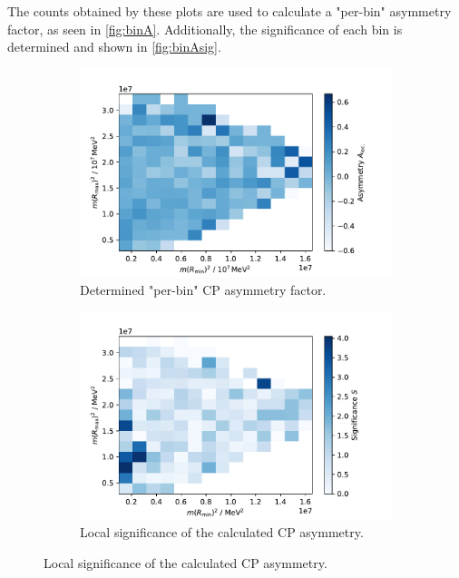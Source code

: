 The counts obtained by these plots are used to calculate a "per-bin" asymmetry factor, 
as seen in \autoref{fig:binA}. Additionally, the significance of each bin is 
determined and shown in \autoref{fig:binAsig}.

\begin{figure}[H]
	\centering
	\begin{subfigure}{0.45\textwidth}
		\includegraphics[width=\textwidth]{content/pictures/image_fin/DalitzDataBPhistACPV.pdf}
		\caption{Determined "per-bin"  CP asymmetry factor.}
		\label{fig:binA}
	\end{subfigure}
	\begin{subfigure}{0.45\textwidth}
		\includegraphics[width=\textwidth]{content/pictures/image_fin/DalitzDataBPhistACPVsig.pdf}
		\caption{Local significance of the calculated CP asymmetry.}
		\label{fig:binAsig}
	\end{subfigure} 
\end{figure}

